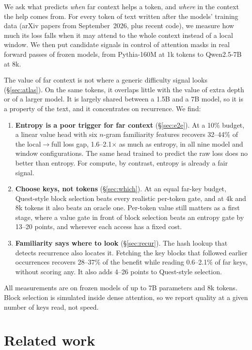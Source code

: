 \documentclass[11pt]{article}
\begin{document}
We ask what predicts \emph{when} far context helps a token, and \emph{where} in the context the help comes from. For every token of text written after the models' training data (arXiv papers from September~2026, plus recent code), we measure how much its loss falls when it may attend to the whole context instead of a local window. We then put candidate signals in control of attention masks in real forward passes of frozen models, from Pythia-160M at 1k tokens to Qwen2.5-7B at 8k.

The value of far context is not where a generic difficulty signal looks (\S\ref{sec:atlas}). On the same tokens, it overlaps little with the value of extra depth or of a larger model. It is largely shared between a 1.5B and a 7B model, so it is a property of the text, and it concentrates on recurrence. We find:
\begin{enumerate}
\item \textbf{Entropy is a poor trigger for far context} (\S\ref{sec:e2e}). At a 10\% budget, a linear value head with six $n$-gram familiarity features recovers 32--44\% of the local$\to$full loss gap, 1.6--2.1$\times$ as much as entropy, in all nine model and window configurations. The same head trained to predict the raw loss does no better than entropy. For compute, by contrast, entropy is already a fair signal.
\item \textbf{Choose keys, not tokens} (\S\ref{sec:which}). At an equal far-key budget, Quest-style block selection beats every realistic per-token gate, and at 4k and 8k tokens it also beats an oracle one. Per-token value still matters as a first stage, where a value gate in front of block selection beats an entropy gate by 13--20 points, and wherever each access has a fixed cost.
\item \textbf{Familiarity says where to look} (\S\ref{sec:recur}). The hash lookup that detects recurrence also locates it. Fetching the key blocks that followed earlier occurrences recovers 28--37\% of the benefit while reading 0.6--2.1\% of far keys, without scoring any. It also adds 4--26 points to Quest-style selection.
\end{enumerate}
All measurements are on frozen models of up to 7B parameters and 8k tokens. Block selection is simulated inside dense attention, so we report quality at a given number of keys read, not speed.

\section{Related work}
\end{document}
